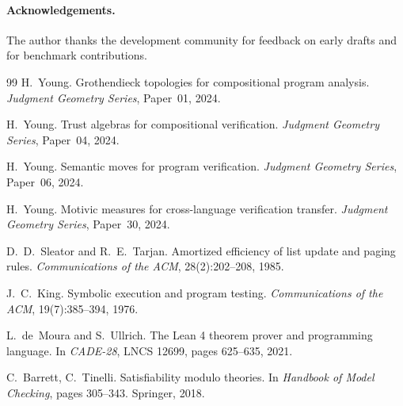 \documentclass[11pt]{article}
\begin{document}
\paragraph{Acknowledgements.}
The author thanks the \JuGeo{} development community for feedback
on early drafts and for benchmark contributions.

\begin{thebibliography}{99}
H.~Young.
\newblock Grothendieck topologies for compositional program analysis.
\newblock \textit{Judgment Geometry Series}, Paper~01, 2024.

H.~Young.
\newblock Trust algebras for compositional verification.
\newblock \textit{Judgment Geometry Series}, Paper~04, 2024.

H.~Young.
\newblock Semantic moves for program verification.
\newblock \textit{Judgment Geometry Series}, Paper~06, 2024.

H.~Young.
\newblock Motivic measures for cross-language verification transfer.
\newblock \textit{Judgment Geometry Series}, Paper~30, 2024.

D.~D.~Sleator and R.~E.~Tarjan.
\newblock Amortized efficiency of list update and paging rules.
\newblock \textit{Communications of the ACM}, 28(2):202--208, 1985.

J.~C.~King.
\newblock Symbolic execution and program testing.
\newblock \textit{Communications of the ACM}, 19(7):385--394, 1976.

L.~de~Moura and S.~Ullrich.
\newblock The Lean 4 theorem prover and programming language.
\newblock In \textit{CADE-28}, LNCS 12699, pages 625--635, 2021.

C.~Barrett, C.~Tinelli.
\newblock Satisfiability modulo theories.
\newblock In \textit{Handbook of Model Checking}, pages 305--343.
  Springer, 2018.
\end{thebibliography}
\end{document}
